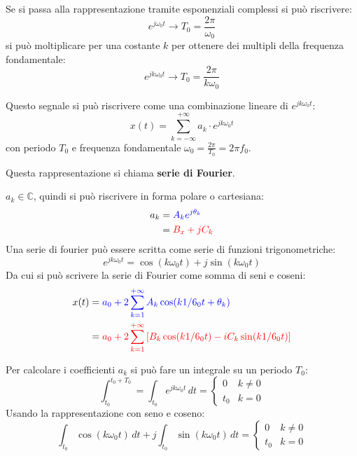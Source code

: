 \documentclass[a4paper]{article}
\begin{document}
\vspace{1em}
\noindent
Se si passa alla rappresentazione tramite esponenziali complessi si può riscrivere:
\[
  e^{j \omega_0 t} \to  T_0 = \frac{2\pi}{\omega_0}
\] 
si può moltiplicare per una costante \( k \) per ottenere dei multipli della frequenza
fondamentale:
\[
  e^{j k \omega_0 t} \to T_0 = \frac{2\pi}{k \omega_0}
\] 

\vspace{1em}
\noindent
\begin{definition}
  Questo segnale si può riscrivere come una combinazione lineare di \( e^{j k \omega_0 t} \):
  \[
    x(t) = \sum_{k=-\infty}^{+\infty} a_k \cdot e^{j k \omega_0 t}
  \] 
  con periodo \( T_0 \) e frequenza fondamentale \( \omega_0 = \frac{2 \pi}{T_0} = 2 \pi f_0 \).

  Questa rappresentazione si chiama \textbf{serie di Fourier}.
\end{definition}

\vspace{1em}
\noindent
\( a_k \in \mathbb{C} \), quindi si può riscrivere in forma polare o cartesiana:
\[
\begin{aligned}
  a_k &= \color{blue}A_k e^{j \theta_k} \\
      &= \color{red}B_x + j C_k
\end{aligned}
\] 
Una serie di fourier può essere scritta come serie di funzioni trigonometriche:
\[
  e^{j k \omega_0 t} = \cos(k \omega_0 t) + j \sin(k \omega_0 t)
\] 
Da cui si può scrivere la serie di Fourier come somma di seni e coseni:
\[
  \begin{aligned}
    x(t) &= \color{blue}a_0 + 2 \sum_{k=1}^{+\infty} A_k \cos(k \omega_0 t + \theta_k)\\
         &= \color{red}a_0 + 2 \sum_{k=1}^{+\infty} \left[ B_k \cos(k \omega_0 t) - i C_k \sin(k \omega_0 t) \right]
  \end{aligned}
\] 

\vspace{1em}
\noindent
Per calcolare i coefficienti \( a_k \) si può fare un integrale su un periodo \( T_0 \):
\[
  \int_{t_0}^{t_0 + T_0} = \int_{t_0} e^{j k \omega_0 t} \, dt = \begin{cases}
    0 & k \neq 0\\
    t_0 & k = 0
  \end{cases}
\] 
Usando la rappresentazione con seno e coseno:
\[
  \int_{t_0} \cos(k \omega_0 t) \, dt + j \int_{t_0} \sin(k \omega_0 t) \, dt = \begin{cases}
    0 & k \neq 0\\
    t_0 & k = 0
  \end{cases}
\] 
\end{document}
